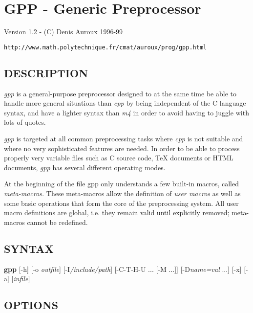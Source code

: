 


\chapter{GPP - Generic Preprocessor}
\label{gpp-man}

\begin{center}
Version 1.2 - (C) Denis Auroux 1996-99

\verb|http://www.math.polytechnique.fr/cmat/auroux/prog/gpp.html|
\end{center}

\htmlHR

\section{DESCRIPTION}

{\it gpp} is a general-purpose preprocessor designed to at the same time be
able to handle more general situations than {\it cpp} by being independent of
the C language syntax, and have a lighter syntax than {\it m4} in order to
avoid having to juggle with lots of quotes. 

{\it gpp} is targeted at all common preprocessing tasks where {\it cpp} is not
suitable and where no very sophisticated features are needed. In order to be
able to process properly very variable files such as C source code, TeX
documents or HTML documents, {\it gpp} has several different operating modes. 

At the beginning of the file gpp only understands a few built-in macros,
called { \em meta-macros.} These meta-macros allow the definition of { \em user
macros} as well as some basic operations that form the core of the
preprocessing system. All user macro definitions are global, i.e. they remain
valid until explicitly removed; meta-macros cannot be redefined. 

\htmlHR

\section{SYNTAX}

{\bf gpp} [-h] [-o {\it outfile}] [-I{\it /include/path}]
[-C{\htmlBar}-T{\htmlBar}-H{\htmlBar}-U ... [-M ...]] [-D{\it name=val} ...]
[-x] [-a] [{\it infile}] 

\htmlHR

\section{OPTIONS}

